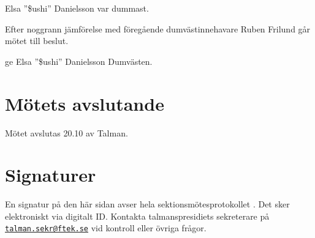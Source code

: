 \documentclass[hidelinks]{sektionsmote}
\begin{document}
\begin{beslut}
    \item Elsa ''\$ushi'' Danielsson var dummast.
\end{beslut}
Efter noggrann jämförelse med föregående dumvästinnehavare Ruben Frilund går mötet till beslut.
\begin{beslut}
    \item ge Elsa ''\$ushi'' Danielsson Dumvästen.
\end{beslut}


\section{Mötets avslutande}
Mötet avslutas 20.10 av Talman.

\clearpage
\section*{Signaturer}
\label{sec:sig}
En signatur på den här sidan avser hela sektionsmötesprotokollet \themote. Det sker elektroniskt via digitalt ID. Kontakta talmanspresidiets sekreterare på \href{mailto:talman.sekr@ftek.se}{\texttt{talman.sekr@ftek.se}} vid kontroll eller övriga frågor. 

\vspace{4cm}
\begin{center}
\end{center}
\end{document}
